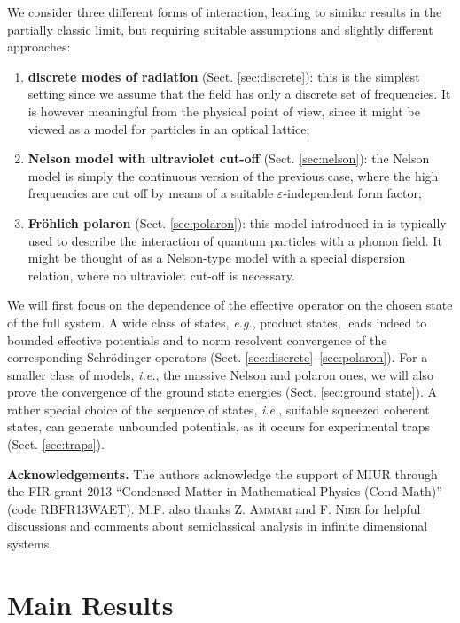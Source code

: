 \documentclass[11pt,a4paper,reqno]{amsart}
\theoremstyle{definition}
\numberwithin{equation}{section}
\newcommand{\ben}{\begin{enumerate}}
\newcommand{\een}{\end{enumerate}}
\newcommand{\eps}{\varepsilon}
\begin{document}
We consider three different forms of interaction, leading to similar results in the partially classic limit, but requiring suitable assumptions and slightly different approaches: 
\ben[1)]
	\item {\bf discrete modes of radiation} (Sect. \ref{sec:discrete}): this is the simplest setting since we assume that the field has only a discrete set of frequencies. It is however meaningful from the physical point of view, since it might be viewed as a model for particles in an optical lattice;
	\item {\bf Nelson model with ultraviolet cut-off} (Sect. \ref{sec:nelson}): the Nelson model \cite{nelson:1190} is simply the continuous version of the previous case, where the high frequencies are cut off by means of a suitable $ \eps$-independent form factor;
	\item {\bf Fr\"{o}hlich polaron} (Sect. \ref{sec:polaron}): this model introduced in \cite{Frohlich230} is typically used to describe the interaction of quantum particles with a phonon field. It might be thought of as a Nelson-type model with a special dispersion relation, where no ultraviolet cut-off is necessary.
\een

We will first focus on the dependence of the effective operator on the chosen state of the full system. A wide class of states, \emph{e.g.}, product states, leads indeed to bounded effective potentials and to norm resolvent convergence of the corresponding Schr\"{o}dinger operators (Sect. \ref{sec:discrete}--\ref{sec:polaron}). For a smaller class of models, {\it i.e.}, the massive Nelson and polaron ones, we will also prove the convergence of the ground state energies (Sect. \ref{sec:ground state}). A rather special choice of the sequence of states, \emph{i.e.}, suitable squeezed coherent states, can generate unbounded potentials, as it occurs for experimental traps (Sect. \ref{sec:traps}).

\bigskip

\noindent
{\bf Acknowledgements.} The authors acknowledge the support of MIUR through the FIR grant 2013 ``Condensed Matter in Mathematical Physics (Cond-Math)'' (code RBFR13WAET). \textsc{M.F.} also thanks \textsc{Z. Ammari} and \textsc{F. Nier} for helpful discussions and comments about semiclassical analysis in infinite dimensional systems.


\section{Main Results}
\label{sec:main}
\end{document}
